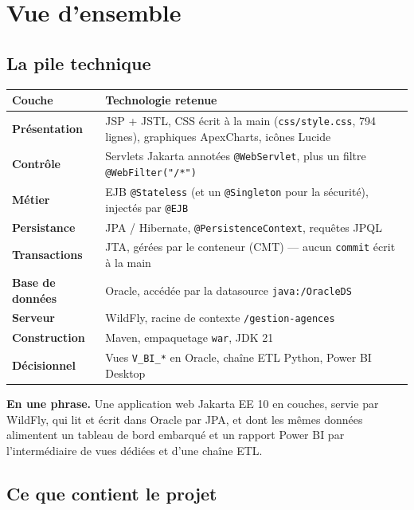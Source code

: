 \section{Vue d'ensemble}

\subsection{La pile technique}

\noindent\begin{tabularx}{\textwidth}{|>{\bfseries}L{3.4cm}|X|}
\hline
Couche & Technologie retenue\\
\hline
Présentation & JSP + JSTL, CSS écrit à la main (\texttt{css/style.css}, 794 lignes), graphiques ApexCharts, icônes Lucide\\
\hline
Contrôle & Servlets Jakarta annotées \texttt{@WebServlet}, plus un filtre \texttt{@WebFilter("/*")}\\
\hline
Métier & EJB \texttt{@Stateless} (et un \texttt{@Singleton} pour la sécurité), injectés par \texttt{@EJB}\\
\hline
Persistance & JPA / Hibernate, \texttt{@PersistenceContext}, requêtes JPQL\\
\hline
Transactions & JTA, gérées par le conteneur (CMT) --- aucun \texttt{commit} écrit à la main\\
\hline
Base de données & Oracle, accédée par la datasource \texttt{java:/OracleDS}\\
\hline
Serveur & WildFly, racine de contexte \texttt{/gestion-agences}\\
\hline
Construction & Maven, empaquetage \texttt{war}, JDK 21\\
\hline
Décisionnel & Vues \texttt{V\_BI\_*} en Oracle, chaîne ETL Python, Power BI Desktop\\
\hline
\end{tabularx}

\begin{retenir}
\textbf{En une phrase.} Une application web Jakarta EE 10 en couches, servie
par WildFly, qui lit et écrit dans Oracle par JPA, et dont les mêmes données
alimentent un tableau de bord embarqué et un rapport Power BI par
l'intermédiaire de vues dédiées et d'une chaîne ETL.
\end{retenir}

\subsection{Ce que contient le projet}

